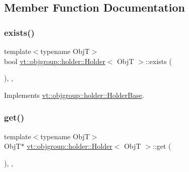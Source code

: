 \subsection{Member Function Documentation}
\mbox{\label{structvt_1_1objgroup_1_1holder_1_1_holder_a0c18e5f4287e37e6a89a72df90e68273}} 
\subsubsection{\texorpdfstring{exists()}{exists()}}
{\footnotesize\ttfamily template$<$typename ObjT$>$ \\
bool \hyperlink{structvt_1_1objgroup_1_1holder_1_1_holder}{vt\+::objgroup\+::holder\+::\+Holder}$<$ ObjT $>$\+::exists (\begin{DoxyParamCaption}{ }\end{DoxyParamCaption})\hspace{0.3cm}{\ttfamily [inline]}, {\ttfamily [override]}, {\ttfamily [virtual]}}



Implements \hyperlink{structvt_1_1objgroup_1_1holder_1_1_holder_base_afeebbe358baf0b2bfea57f52807be564}{vt\+::objgroup\+::holder\+::\+Holder\+Base}.

\mbox{\label{structvt_1_1objgroup_1_1holder_1_1_holder_afa4ab0b8ce4108ad94f602772697c25d}} 
\subsubsection{\texorpdfstring{get()}{get()}}
{\footnotesize\ttfamily template$<$typename ObjT$>$ \\
ObjT$\ast$ \hyperlink{structvt_1_1objgroup_1_1holder_1_1_holder}{vt\+::objgroup\+::holder\+::\+Holder}$<$ ObjT $>$\+::get (\begin{DoxyParamCaption}{ }\end{DoxyParamCaption})\hspace{0.3cm}{\ttfamily [inline]}, {\ttfamily [override]}, {\ttfamily [virtual]}}



